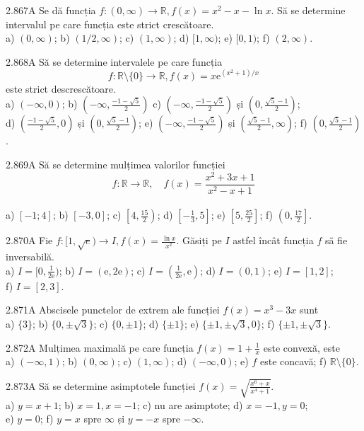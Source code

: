 \documentclass[11pt]{article}
\begin{document}
2.867A Se dă funcția $f:(0, \infty) \rightarrow \mathbb{R}, f(x)=x^{2}-x-\ln x$. Să se determine intervalul pe care funcția este strict crescătoare.\\ a) $(0, \infty)$; b) $(1 / 2, \infty)$; c) $(1, \infty)$; d) $[1, \infty)$; e) $[0,1)$; f) $(2, \infty)$.

2.868A Să se determine intervalele pe care funcția $$f: \mathbb{R} \setminus\{0\} \rightarrow \mathbb{R}, f(x)=x \mathrm{e}^{\left(x^{2}+1\right) / x}$$ este strict descrescătoare.\\ a) $(-\infty, 0)$; b) $\left(-\infty, \frac{-1-\sqrt{5}}{2}\right)$ c) $\left(-\infty, \frac{-1-\sqrt{5}}{2}\right)$ și $\left(0, \frac{\sqrt{5}-1}{2}\right)$;\\ d) $\left(\frac{-1-\sqrt{5}}{2}, 0\right)$ și $\left(0, \frac{\sqrt{5}-1}{2}\right)$; e) $\left(-\infty, \frac{-1-\sqrt{5}}{2}\right)$ și $\left(\frac{\sqrt{5}-1}{2}, \infty\right)$; f) $\left(0, \frac{\sqrt{5}-1}{2}\right)$.

2.869A Să se determine mulțimea valorilor funcției $$f: \mathbb{R} \rightarrow \mathbb{R}, \quad f(x)=\frac{x^{2}+3 x+1}{x^{2}-x+1}$$\\ a) $[-1 ; 4]$; b) $[-3,0]$; c) $\left[4, \frac{15}{2}\right)$; d) $\left[-\frac{1}{3}, 5\right]$; e) $\left[5, \frac{25}{2}\right]$; f) $\left(0, \frac{17}{2}\right]$.

2.870A Fie $f:[1, \sqrt{e}) \rightarrow I, f(x)=\frac{\ln x}{x^{2}}$. Găsiți pe $I$ astfel încât funcția $f$ să fie inversabilă.\\ a) $I=[0,\frac{1}{2 \mathrm{e}})$; b) $I=(\mathrm{e},2 \mathrm{e})$; c) $I=(\frac{1}{2 \mathrm{e}},\mathrm{e})$; d) $I=(0,1)$; e) $I=[1,2]$;\\ f) $I=[2,3]$. 

2.871A Abscisele punctelor de extrem ale funcției $f(x)=x^{3}-3 x$ sunt\\ a) $\{3\}$; b) $\{0, \pm \sqrt{3}\}$; c) $\{0, \pm 1\}$; d) $\{ \pm 1\}$; e) $\{ \pm 1, \pm \sqrt{3}, 0\}$; f) $\{ \pm 1, \pm \sqrt{3}\}$.

2.872A Mulțimea maximală pe care funcția $f(x)=1+\frac{1}{x}$ este convexă, este\\ a) $(-\infty, 1)$; b) $(0, \infty)$; c) $(1, \infty)$; d) $(-\infty, 0)$; e) $f$ este concavă; f) $\mathbb{R} \setminus\{0\}$.

2.873A Să se determine asimptotele funcției $f(x)=\sqrt{\frac{x^{6}+x}{x^{4}+1}}$.\\ a) $y=x+1$; b) $x=1, x=-1$; c) nu are asimptote; d) $x=-1, y=0$;\\ e) $y=0$; f) $y=x$ spre $\infty$ și $y=-x$ spre $-\infty$.
\end{document}
